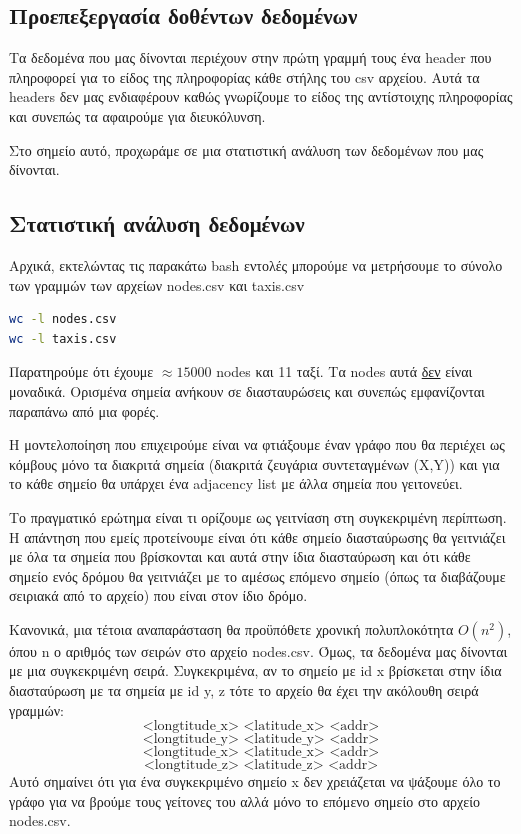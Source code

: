\documentclass[a4paper,oneside, 11pt]{article}
\begin{document}
 

\subsection{Προεπεξεργασία δοθέντων δεδομένων}
Τα δεδομένα που μας δίνονται περιέχουν στην πρώτη γραμμή τους ένα header που πληροφορεί για το είδος της πληροφορίας κάθε στήλης του csv αρχείου. Αυτά τα headers δεν μας ενδιαφέρουν καθώς γνωρίζουμε το είδος της αντίστοιχης πληροφορίας και συνεπώς τα αφαιρούμε για διευκόλυνση. \bigbreak 

Στο σημείο αυτό, προχωράμε σε μια στατιστική ανάλυση των δεδομένων που μας δίνονται.
\subsection{Στατιστική ανάλυση δεδομένων}
Αρχικά, εκτελώντας τις παρακάτω bash εντολές μπορούμε να μετρήσουμε το σύνολο των γραμμών των αρχείων nodes.csv και taxis.csv

\begin{lstlisting}[language=Bash]
wc -l nodes.csv
wc -l taxis.csv
\end{lstlisting}

Παρατηρούμε ότι έχουμε $\approx 15000$ nodes και 11 ταξί. Τα nodes αυτά \underline{δεν} είναι μοναδικά. Ορισμένα σημεία ανήκουν σε διασταυρώσεις και συνεπώς εμφανίζονται παραπάνω από μια φορές. \bigbreak 

Η μοντελοποίηση που επιχειρούμε είναι να φτιάξουμε έναν γράφο που θα περιέχει ως κόμβους μόνο τα διακριτά σημεία (διακριτά ζευγάρια συντεταγμένων (X,Y)) και για το κάθε σημείο θα υπάρχει ένα adjacency list με άλλα σημεία που γειτονεύει. \bigbreak 

Το πραγματικό ερώτημα είναι τι ορίζουμε ως γειτνίαση στη συγκεκριμένη περίπτωση. Η απάντηση που εμείς προτείνουμε είναι ότι κάθε σημείο διασταύρωσης θα γειτνιάζει με όλα τα σημεία που βρίσκονται και αυτά στην ίδια διασταύρωση και ότι κάθε σημείο ενός δρόμου θα γειτνιάζει με το αμέσως επόμενο σημείο (όπως τα διαβάζουμε σειριακά από το αρχείο) που είναι στον ίδιο δρόμο. \bigbreak 

Κανονικά, μια τέτοια αναπαράσταση θα προϋπόθετε χρονική πολυπλοκότητα $O(n^2)$, όπου n ο αριθμός των σειρών στο αρχείο nodes.csv. Όμως, τα δεδομένα μας δίνονται με μια συγκεκριμένη σειρά. Συγκεκριμένα, αν το σημείο με id x βρίσκεται στην ίδια διασταύρωση με τα σημεία με id y, z τότε το αρχείο θα έχει την ακόλουθη σειρά γραμμών:
$$\textrm{<longtitude\_x> <latitude\_x> <addr>}$$
$$\textrm{<longtitude\_y> <latitude\_y> <addr>}$$
$$\textrm{<longtitude\_x> <latitude\_x> <addr>}$$
$$\textrm{<longtitude\_z> <latitude\_z> <addr>}$$
Αυτό σημαίνει ότι για ένα συγκεκριμένο σημείο x δεν χρειάζεται να ψάξουμε όλο το γράφο για να βρούμε τους γείτονες του αλλά μόνο το επόμενο σημείο στο αρχείο nodes.csv. \bigbreak
\end{document}
